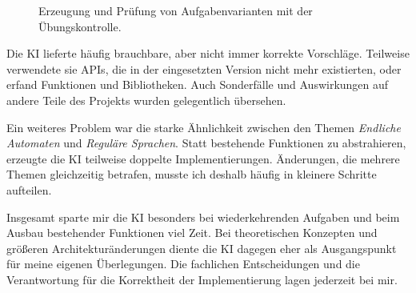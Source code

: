 \begin{figure}[htbp]
	\centering
	\caption[Erzeugung und Prüfung von Aufgabenvarianten]{%
		Erzeugung und Prüfung von Aufgabenvarianten mit der Übungskontrolle.}
	\label{fig:ki_aufgaben}
\end{figure}


Die KI lieferte häufig brauchbare, aber nicht immer korrekte Vorschläge.
Teilweise verwendete sie APIs, die in der eingesetzten Version nicht mehr existierten,
oder erfand Funktionen und Bibliotheken.
Auch Sonderfälle und Auswirkungen auf andere Teile des Projekts wurden gelegentlich
übersehen.

Ein weiteres Problem war die starke Ähnlichkeit zwischen den Themen
\emph{Endliche Automaten} und \emph{Reguläre Sprachen}.
Statt bestehende Funktionen zu abstrahieren, erzeugte die KI teilweise doppelte
Implementierungen.
Änderungen, die mehrere Themen gleichzeitig betrafen, musste ich deshalb häufig in
kleinere Schritte aufteilen.

Insgesamt sparte mir die KI besonders bei wiederkehrenden Aufgaben und beim Ausbau
bestehender Funktionen viel Zeit.
Bei theoretischen Konzepten und größeren Architekturänderungen diente die KI dagegen eher als Ausgangspunkt 
für meine eigenen Überlegungen. Die fachlichen Entscheidungen und die Verantwortung 
für die Korrektheit der Implementierung lagen jederzeit bei mir.